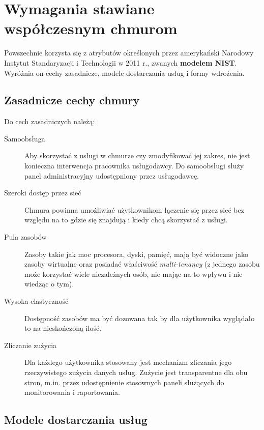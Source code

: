 \documentclass[12pt,a4paper,twoside,titlepage,openright]{book}
\begin{document}
\section{Wymagania stawiane współczesnym chmurom}

Powszechnie korzysta się z atrybutów określonych przez amerykański Narodowy Instytut Standaryzacji i Technologii w 2011 r., zwanych \textbf{modelem NIST}. Wyróżnia on cechy zasadnicze, modele dostarczania usług i formy wdrożenia. \cite{nistArticle, ccCambridge, azurePackt}

\subsection{Zasadnicze cechy chmury}

Do cech zasadniczych należą:

\begin{description}
\item [Samoobsługa] Aby skorzystać z usługi w chmurze czy zmodyfikować jej zakres, nie jest konieczna interwencja pracownika usługodawcy. Do samoobsługi służy panel administracyjny udostępniony przez usługodawcę.
\item [Szeroki dostęp przez sieć] Chmura powinna umożliwiać użytkownikom łączenie się przez sieć bez względu na to gdzie się znajdują i kiedy chcą skorzystać z usługi.
\item [Pula zasobów] Zasoby takie jak moc procesora, dyski, pamięć, mają być widoczne jako zasoby wirtualne oraz posiadać właściwość \textit{multi-tenancy} (z jednego zasobu może korzystać wiele niezależnych osób, nie mając na to wpływu i nie wiedząc o tym).
\item [Wysoka elastyczność] Dostępność zasobów ma być dozowana tak by dla użytkownika wyglądało to na nieskończoną ilość.
\item [Zliczanie zużycia] Dla każdego użytkownika stosowany jest mechanizm zliczania jego rzeczywistego zużycia danych usług. Zużycie jest transparentne dla obu stron, m.in. przez udostępnienie stosownych paneli służących do monitorowania i raportowania.
\end{description}

\subsection{Modele dostarczania usług}
\end{document}
